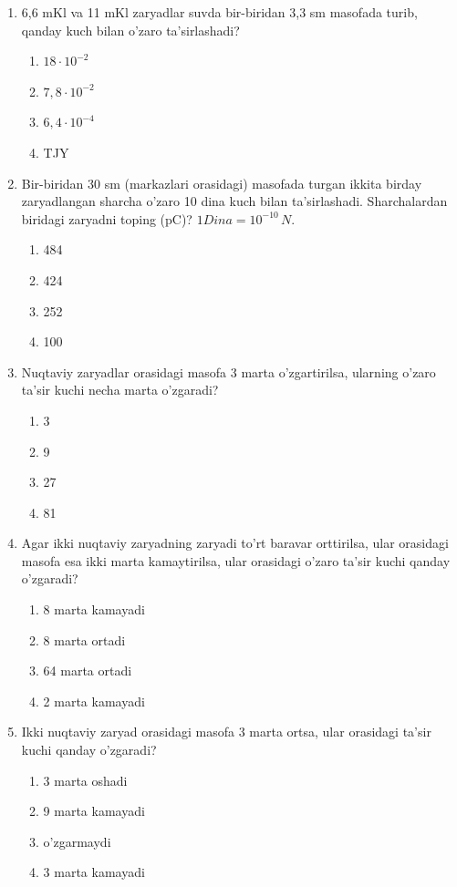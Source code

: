 \begin{enumerate}
\item 6,6 mKl va 11 mKl zaryadlar suvda bir-biridan 3,3 sm masofada turib, qanday kuch bilan o'zaro ta'sirlashadi?
\begin{enumerate}[label=\Alph*)]
\item $18 \cdot 10^{-2}$
\item $7,8 \cdot 10^{-2}$
\item $6,4 \cdot 10^{-4}$
\item TJY
\end{enumerate}

\item Bir-biridan 30 sm (markazlari orasidagi) masofada turgan ikkita birday zaryadlangan sharcha o'zaro 10 dina kuch bilan ta'sirlashadi. Sharchalardan biridagi zaryadni toping (pC)? $1 Dina = 10^{-10} \, N$.
\begin{enumerate}[label=\Alph*)]
\item 484
\item 424
\item 252
\item 100
\end{enumerate}

\item Nuqtaviy zaryadlar orasidagi masofa 3 marta o'zgartirilsa, ularning o'zaro ta'sir kuchi necha marta o'zgaradi?
\begin{enumerate}[label=\Alph*)]
\item 3
\item 9
\item 27
\item 81
\end{enumerate}

\item Agar ikki nuqtaviy zaryadning zaryadi to'rt baravar orttirilsa, ular orasidagi masofa esa ikki marta kamaytirilsa, ular orasidagi o'zaro ta'sir kuchi qanday o'zgaradi?
\begin{enumerate}[label=\Alph*)]
\item 8 marta kamayadi
\item 8 marta ortadi
\item 64 marta ortadi
\item 2 marta kamayadi
\end{enumerate}

\item Ikki nuqtaviy zaryad orasidagi masofa 3 marta ortsa, ular orasidagi ta'sir kuchi qanday o'zgaradi?
\begin{enumerate}[label=\Alph*)]
\item 3 marta oshadi
\item 9 marta kamayadi
\item o'zgarmaydi
\item 3 marta kamayadi
\end{enumerate}


\end{enumerate}

